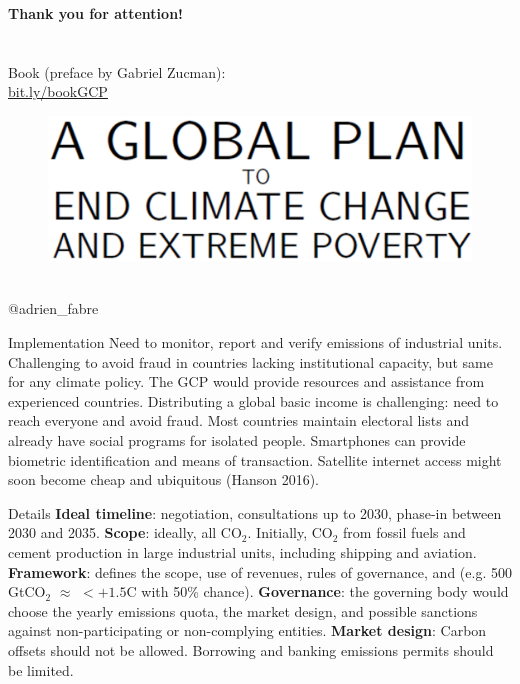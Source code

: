 \documentclass[aspectratio=169,xcolor=dvipsnames, 11pt,mathserif]{beamer}
\begin{document}
\begin{frame}{}
\centering \Large \textbf{Thank you for attention!}
% 
~\\ \quad \\ \quad \\ %
Book (preface by Gabriel Zucman): \\ \href{https://bit.ly/bookGCP}{bit.ly/bookGCP}
\begin{figure}
    \includegraphics[height=.37\textheight]{../book/cover_en_title.PNG} 
\end{figure}    
~\\ @adrien\_fabre 
\end{frame}

\begin{frame}{Implementation}
    \bbsp \ip Need to monitor, report and verify emissions of industrial units.
        \bbsp \ip Challenging to avoid fraud in countries lacking institutional capacity, but same for any climate policy.
        \ip The GCP would provide resources and assistance from experienced countries. \ee
    \ip Distributing a global basic income is challenging: need to reach everyone and avoid fraud.
        \bbsp \ip Most countries maintain electoral lists and already have social programs for isolated people.
        \ip Smartphones can provide biometric identification and means of transaction.
        \ip Satellite internet access might soon become cheap and ubiquitous (Hanson 2016).
        \ee
    \ee 
\end{frame}

\begin{frame}{Details}
    \bbsp \ip \textbf{Ideal timeline}: negotiation, consultations up to 2030, phase-in between 2030 and 2035.
    \ip \textbf{Scope}: ideally, all CO$_\text{2}$. Initially, CO$_\text{2}$ from fossil fuels and cement production in large industrial units, including shipping and aviation.
    \ip \textbf{Framework}: defines the scope, use of revenues, rules of governance, and  (e.g. 500 GtCO$_\text{2}$ 
    $\approx$ $<+1.5$\textdegree{}C with 50\% chance). %
    \ip \textbf{Governance}: the governing body would choose the yearly emissions quota, the market design, and possible sanctions against non-participating or non-complying entities. %
    \ip \textbf{Market design}: Carbon offsets should not be allowed. Borrowing and banking emissions permits should be limited.
    \ee
\end{frame}
\end{document}

